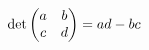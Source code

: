 \documentclass[preview]{standalone}
\begin{document}
\begin{align*}
\special{dvisvgm:raw <g id='unique000'>}\det\begin{pmatrix} a & b \\ c & d \end{pmatrix} = ad - bc\special{dvisvgm:raw </g>}
\end{align*}
\end{document}
